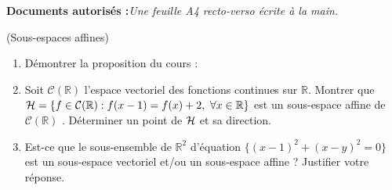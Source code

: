 \documentclass[a4paper,12pt,reqno]{amsart}
\begin{document}
\ifsolutions\else
\textbf{Documents autorisés :}\textit{Une feuille A4 recto-verso écrite à la main.}

\tsvp

\vspace{7mm}
\fi

\begin{exo} (Sous-espaces affines)
  \begin{enumerate}
    \item Démontrer la proposition du cours :


    \smallskip

    \item Soit $\mathcal{C}(\mathbb{R})$ l'espace vectoriel des fonctions continues sur $\mathbb{R}$. Montrer que $\mathcal{H} = \{ f \in \mathcal{C}(\mathbb{R}) : f(x-1)=f(x)+2, \ \forall x \in \mathbb{R} \}$
  est un sous-espace affine de $\mathcal{C}(\mathbb{R})$ . Déterminer
  un point de $\mathcal{H}$ et sa direction.

    \item Est-ce que le sous-ensemble de $\mathbb{R}^{2}$ d'équation $\{(x-1)^{2}+(x-y)^{2}=0\}$ est un sous-espace vectoriel et/ou un sous-espace affine ? Justifier votre réponse.
  \end{enumerate}
\end{exo}
\end{document}
